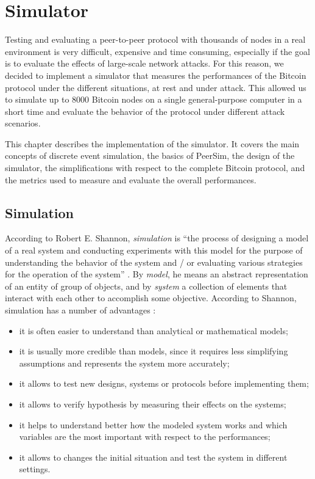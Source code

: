 \chapter{Simulator}
\label{chapter:simulator}

Testing and evaluating a peer-to-peer protocol with thousands of nodes in a real environment is very difficult, expensive and time consuming, especially if the goal is to evaluate the effects of large-scale network attacks.
For this reason, we decided to implement a simulator that measures the performances of the Bitcoin protocol under the different situations, at rest and under attack.
This allowed us to simulate up to \num{8000} Bitcoin nodes on a single general-purpose computer in a short time and evaluate the behavior of the protocol under different attack scenarios.

\medskip
This chapter describes the implementation of the simulator.
It covers the main concepts of discrete event simulation, the basics of PeerSim, the design of the simulator, the simplifications with respect to the complete Bitcoin protocol, and the metrics used to measure and evaluate the overall performances.


\section{Simulation}
According to Robert E. Shannon, \textit{simulation} is ``the process of designing a model of a real system and conducting experiments with this model for the purpose of understanding the behavior of the system and / or evaluating various strategies for the operation of the system'' \cite{simulation_shannon_1998}.
By \textit{model}, he means an abstract representation of an entity of group of objects, and by \textit{system} a collection of elements that interact with each other to accomplish some objective.
According to Shannon, simulation has a number of advantages \cite{simulation_shannon_1998}:
\begin{itemize}
	\item it is often easier to understand than analytical or mathematical models;
	\item it is usually more credible than models, since it requires less simplifying assumptions and represents the system more accurately;
	\item it allows to test new designs, systems or protocols before implementing them;
	\item it allows to verify hypothesis by measuring their effects on the systems;
	\item it helps to understand better how the modeled system works and which variables are the most important with respect to the performances;
	\item it allows to changes the initial situation and test the system in different settings.
\end{itemize}

